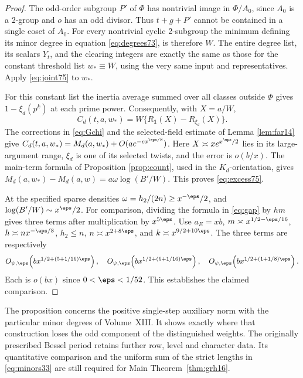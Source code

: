 \documentclass[a4paper,11pt]{article}
\theoremstyle{definition}
\theoremstyle{remark}
\numberwithin{equation}{section}
\begin{document}
\begin{proof}
The odd-order subgroup \(P'\) of \(\Phi\) has nontrivial
image in \(\Phi/A_0\), since \(A_0\) is a 2-group and
\(o\) has an odd divisor. Thus \(t+g+P'\) cannot be
contained in a single coset of \(A_0\). For every nontrivial
cyclic 2-subgroup the minimum defining its minor degree in
equation \ref{eq:degrees73}, is therefore \(W\).
The entire degree list, its scalars \(Y_t\), and the clearing
integers are exactly the same as those for the constant
threshold list \(w_*\equiv W\), using the very same input
and representatives. Apply \eqref{eq:joint75} to \(w_*\).

For this constant list the inertia average summed over all
classes outside \(\Phi\) gives \(1-\xi_d(p^k)\) at each
prime power. Consequently, with \(X=a/W\),
\[
       C_d(t,a,w_*)=W\{R_{\mathbf1}(X)-R_{\xi_d}(X)\}.
\]
The corrections in \eqref{eq:Gchi} and the selected-field estimate
of Lemma \ref{lem:far14}
give \(C_d(t,a,w_*)=M_d(a,w_*)+O(ae^{-c x^{\eps/8}})\).
Here \(X\asymp x e^{x^\eps/2}\) lies in its large-argument
range, \(\xi_d\) is one of its selected twists, and the error
is \(o(b/x)\). The main-term formula of Proposition
\ref{prop:count}, used in the \(K_d\)-orientation, gives
\(M_d(a,w_*)-M_d(a,w)=a\omega\log(B'/W)\). This proves
\eqref{eq:excess75}.

At the specified sparse densities \(\omega=h_2/(2n)\ge
x^{-\eps}/2\), and \(\log(B'/W)\sim x^\eps/2\).
For comparison, dividing the formula in \eqref{eq:gap} by
\(hm\) gives three terms after multiplication by \(x^{5\eps}\).
Use \(a_E=xb\), \(m\asymp x^{1/2-\eps/16}\),
\(h\asymp n x^{-\eps/8}\), \(h_2\le n\),
\(n\asymp x^{2+8\eps}\), and \(k\asymp x^{9/2+10\eps}\).
The three terms are respectively
\[
 O_{\psi,\eps}\!\left(bx^{1/2+(5+1/16)\eps}\right),\quad
 O_{\psi,\eps}\!\left(bx^{1/2+(6+1/16)\eps}\right),\quad
 O_{\psi,\eps}\!\left(bx^{1/2+(1+1/8)\eps}\right).
\]
Each is \(o(bx)\) since \(0<\eps<1/52\).
This establishes the claimed comparison.
\end{proof}

The proposition concerns the positive single-step auxiliary
norm with the particular minor degrees of Volume~XIII. It shows
exactly where that construction loses the odd component of the
distinguished weights. The originally prescribed Bessel period
retains further row, level and character data. Its quantitative
comparison and the uniform sum of the strict lengths in
\eqref{eq:minors33} are still required for Main Theorem~\ref{thm:grh16}.
\end{document}
